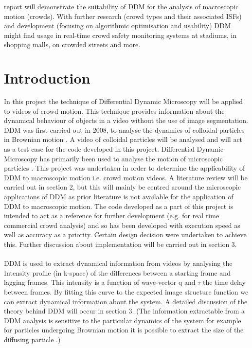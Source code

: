 \documentclass[11pt]{article}
\begin{document}
report will demonstrate the suitability of DDM for the analysis of macroscopic motion (crowds). With further research (crowd types and their associated ISFs) and development (focusing on algorithmic optimisation and usability) DDM might find usage in real-time crowd safety monitoring systems at stadiums, in shopping malls, on crowded streets and more.

\clearpage
\tableofcontents

\clearpage
\section{Introduction}
In this project the technique of Differential Dynamic Microscopy will be applied to videos of crowd motion. This technique provides information about the dynamical behaviour of objects in a video without the use of image segmentation. DDM was first carried out in 2008, to analyse the dynamics of colloidal particles in Brownian motion \cite{ddm0}. A video of colloidal particles will be analysed and will act as a test case for the code developed in this project. Differential Dynamic Microscopy has primarily been used to analyse the motion of microscopic particles \cite{ddm1} \cite{ddm2}. This project was undertaken in order to determine the applicability of DDM to macroscopic motion i.e. crowd motion videos. A literature review will be carried out in section 2, but this will mainly be centred around the microscopic applications of DDM as prior literature is not available for the application of DDM to macroscopic motion. The code developed as a part of this project is intended to act as a reference for further development (e.g. for real time commercial crowd analysis) and so has been developed with execution speed as well as accuracy as a priority. Certain design decision were undertaken to achieve this. Further discussion about implementation will be carried out in section 3.
\\\\
DDM is used to extract dynamical information from videos by analysing the Intensity profile (in k-space) of the differences between a starting frame and lagging frames. This intensity is a function of wave-vector q and $\tau$ the time delay between frames. By fitting this curve to the expected image structure function we can extract dynamical information about the system. A detailed discussion of the theory behind DDM will occur in section 3. (The information extractable from a DDM analysis is sensitive to the particular dynamics of the system for example for particles undergoing Brownian motion it is possible to extract the size of the diffusing particle \cite{ddm1}.)
\end{document}
